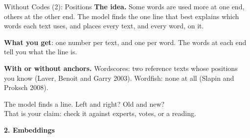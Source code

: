 \documentclass[svgnames,x11names,dvipsnames]{beamer}
\newcommand{\new}[1]{#1}
\begin{document}
\begin{frame}{\new{Without Codes (2): Positions}}
\small
\textbf{The idea.} Some words are used more at one end, others at the other end. The model finds the one line that best explains which words each text uses, and places every text, and every word, on it.

\vspace{0.35cm}
\centering
{}

\vspace{0.35cm}
\raggedright
\small
\textbf{What you get}: one number per text, and one per word. The words at each end tell you what the line is.

\vspace{0.15cm}
\textbf{With or without anchors.} Wordscores: two reference texts whose positions you know (Laver, Benoit and Garry 2003). Wordfish: none at all (Slapin and Proksch 2008).

\vspace{0.25cm}
\centering
\alert{The model finds a line. Left and right? Old and new?\\ That is your claim: check it against experts, votes, or a reading.}
\end{frame}

\begin{frame}[plain]
  \centering
  \vfill
  {\Large \textbf{\textcolor{titleblue}{2. Embeddings}}}
  \vfill
\end{frame}
\end{document}
